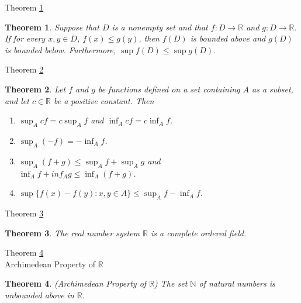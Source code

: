 \documentclass[avery5371,grid]{flashcards}
\newtheorem{theorem}{Theorem}
\newcommand{\bb}[1]{\mathbb{#1}}
\newcommand{\R}{\bb{R}}
\newcommand{\N}{\bb{N}}
\begin{document}
\begin{flashcard}[Theorem]{Theorem \ref{thm33}}
\begin{theorem}
\label{thm33}
Suppose that $D$ is a nonempty set and that $f: D \to \R$ and $g : D \to \R$.  If for every $x,y \in D$, $f(x) \leq g(y)$, then $f(D)$ is bounded above and $g(D)$ is bounded below.  Furthermore, $\sup f(D) \leq \sup g(D)$.
\end{theorem}
\end{flashcard}

\begin{flashcard}[Theorem]{Theorem \ref{thm34}}
\begin{theorem}
\label{thm34}
Let $f$ and $g$ be functions defined on a set containing $A$ as a subset,
and let $c \in \R$ be a positive constant.  Then
\begin{enumerate}
\item $\sup _A cf = c \sup _A f$ and $\inf _A cf = c \inf _A f$.
\item $\sup _A (-f) = - \inf _A f$.
\item $\sup _A (f+g) \leq \sup _A f + \sup _A g$ and \\
$\inf _A f + inf _A g \leq \inf _A (f+g)$.
\item $\sup \{ f(x) - f(y) : x,y \in A \} \leq \sup _A f - \inf _A f$.
\end{enumerate}
\end{theorem}
\end{flashcard}

\begin{flashcard}[Theorem]{Theorem \ref{thm35}}
\begin{theorem}
\label{thm35}
The real number system $\R$ is a complete ordered field.
\end{theorem}
\end{flashcard}

\begin{flashcard}[Theorem]{Theorem \ref{thm36}\\
Archimedean Property of $\R$}
\begin{theorem}
\label{thm36}
(Archimedean Property of $\R$) The set $\N$ of natural numbers is
unbounded above in $\R$.
\end{theorem}
\end{flashcard}
\end{document}
